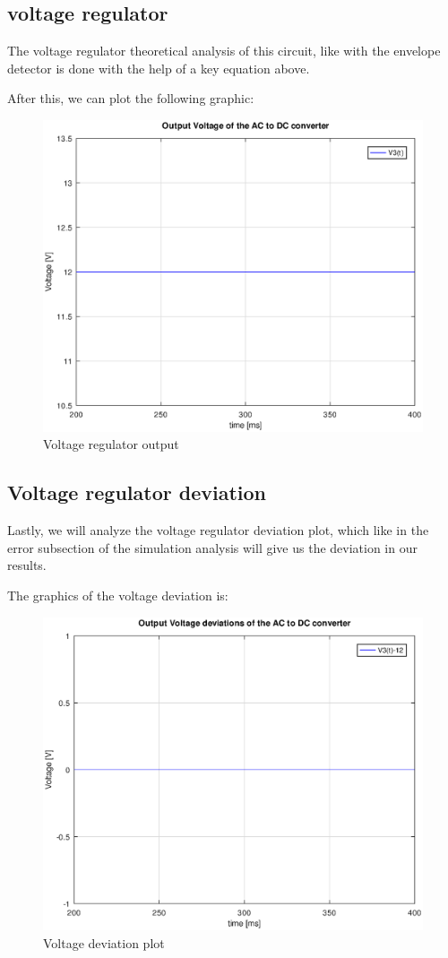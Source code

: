 \subsection{voltage regulator}
The voltage regulator theoretical analysis of this circuit, like with the envelope detector is done with the help of a key equation above.

After this, we can plot the following graphic:
\begin{figure}[H] \centering
	\includegraphics[width=0.6\linewidth]{Output_Voltage_Regulater.eps}
	\caption{Voltage regulator output}
	\label{fig:rc1}
\end{figure}


\subsection{Voltage regulator deviation}
Lastly, we will analyze the voltage regulator deviation plot, which like in the error subsection of the simulation analysis will give us the deviation in our results.

The graphics of the voltage deviation is:
\begin{figure}[H] \centering
\includegraphics[width=0.6\linewidth]{Output_Voltage_Regulater_deviations.eps}
\caption{Voltage deviation plot}
\label{fig:rc4}
\end{figure}



